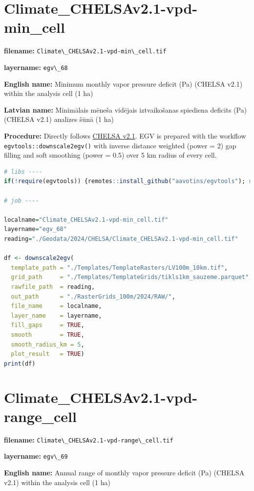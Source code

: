 \documentclass[
]{book}
\newcommand{\passthrough}[1]{#1}
\begin{document}
\section{Climate\_CHELSAv2.1-vpd-min\_cell}\label{ch06.068}

\textbf{filename:} \passthrough{\lstinline!Climate\_CHELSAv2.1-vpd-min\_cell.tif!}

\textbf{layername:} \passthrough{\lstinline!egv\_68!}

\textbf{English name:} Minimum monthly vapor pressure deficit (Pa) (CHELSA v2.1) within the analysis cell (1 ha)

\textbf{Latvian name:} Minimālais mēneša vidējais iztvaikošanas spiediena deficīts (Pa) (CHELSA v2.1) analīzes šūnā (1 ha)

\textbf{Procedure:} Directly follows \hyperref[Ch04.11]{CHELSA v2.1}. EGV is prepared with the
workflow \passthrough{\lstinline!egvtools::downscale2egv()!} with inverse distance weighted (power = 2)
gap filling and soft smoothing (power = 0.5) over 5 km radius of every cell.

\begin{lstlisting}[language=R]
# libs ----
if(!require(egvtools)) {remotes::install_github("aavotins/egvtools"); require(egvtools)}

# job ----

localname="Climate_CHELSAv2.1-vpd-min_cell.tif"
layername="egv_68"
reading="./Geodata/2024/CHELSA/Climate_CHELSAv2.1-vpd-min_cell.tif"

df <- downscale2egv(
  template_path = "./Templates/TemplateRasters/LV100m_10km.tif",
  grid_path     = "./Templates/TemplateGrids/tikls1km_sauzeme.parquet",
  rawfile_path  = reading,
  out_path      = "./RasterGrids_100m/2024/RAW/",
  file_name     = localname,
  layer_name    = layername,
  fill_gaps     = TRUE,
  smooth        = TRUE,
  smooth_radius_km = 5,
  plot_result   = TRUE)
print(df)
\end{lstlisting}

\section{Climate\_CHELSAv2.1-vpd-range\_cell}\label{ch06.069}

\textbf{filename:} \passthrough{\lstinline!Climate\_CHELSAv2.1-vpd-range\_cell.tif!}

\textbf{layername:} \passthrough{\lstinline!egv\_69!}

\textbf{English name:} Annual range of monthly vapor pressure deficit (Pa) (CHELSA v2.1) within the analysis cell (1 ha)
\end{document}
